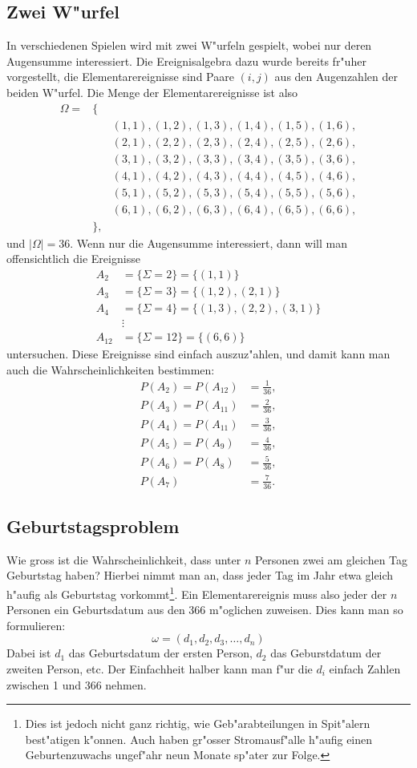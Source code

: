 \subsection{Zwei W"urfel}
In verschiedenen Spielen wird mit zwei W"urfeln gespielt, wobei nur
deren Augensumme interessiert. Die Ereignisalgebra dazu wurde bereits
fr"uher vorgestellt, die Elementarereignisse sind Paare $(i,j)$ aus
den Augenzahlen der beiden W"urfel. Die Menge der Elementarereignisse
ist also
\begin{eqnarray*}
\Omega=&\{&\\
&&(1,1),(1,2),(1,3),(1,4),(1,5),(1,6),\\
&&(2,1),(2,2),(2,3),(2,4),(2,5),(2,6),\\
&&(3,1),(3,2),(3,3),(3,4),(3,5),(3,6),\\
&&(4,1),(4,2),(4,3),(4,4),(4,5),(4,6),\\
&&(5,1),(5,2),(5,3),(5,4),(5,5),(5,6),\\
&&(6,1),(6,2),(6,3),(6,4),(6,5),(6,6),\\
&\},&
\end{eqnarray*}
und $|\Omega|=36$. Wenn nur die Augensumme interessiert, dann will
man offensichtlich die Ereignisse
\begin{align*}
A_2&=\{\Sigma=2\}=\{(1,1)\}\\
A_3&=\{\Sigma=3\}=\{(1,2),(2,1)\}\\
A_4&=\{\Sigma=4\}=\{(1,3),(2,2),(3,1)\}\\
&\vdots\\
A_{12}&=\{\Sigma=12\}=\{(6,6)\}
\end{align*}
untersuchen.
Diese Ereignisse sind einfach auszuz"ahlen, und damit kann man auch
die Wahrscheinlichkeiten bestimmen:
\begin{align*}
P(A_2)=P(A_{12})&=\frac{1}{36},\\
P(A_3)=P(A_{11})&=\frac{2}{36},\\
P(A_4)=P(A_{11})&=\frac{3}{36},\\
P(A_5)=P(A_9)&=\frac{4}{36},\\
P(A_6)=P(A_8)&=\frac{5}{36},\\
P(A_7)&=\frac{7}{36}.
\end{align*}

\subsection{Geburtstagsproblem}
Wie gross ist die Wahrscheinlichkeit, dass unter $n$ Personen zwei
am gleichen Tag Geburtstag haben? Hierbei nimmt man an, dass
jeder Tag im Jahr etwa gleich h"aufig als Geburtstag
vorkommt\footnote{Dies ist
jedoch nicht ganz richtig, wie Geb"arabteilungen in Spit"alern
best"atigen k"onnen. Auch haben gr"osser Stromausf"alle h"aufig
einen Geburtenzuwachs ungef"ahr neun Monate sp"ater zur Folge.}.
Ein Elementarereignis muss also jeder der $n$ Personen ein
Geburtsdatum aus den $366$ m"oglichen zuweisen. Dies kann man so
formulieren:
\[
\omega=(d_1, d_2, d_3,\dots,d_n)
\]
Dabei ist $d_1$ das Geburtsdatum der ersten Person, $d_2$ das
Geburstdatum der zweiten Person, etc. Der Einfachheit halber kann
man f"ur die $d_i$ einfach Zahlen zwischen 1 und 366 nehmen.

